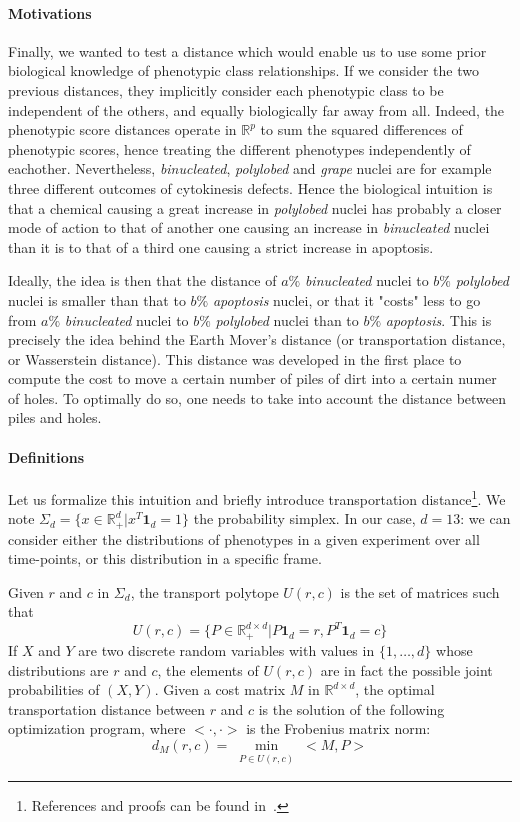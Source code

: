 \paragraph{Motivations}
Finally, we wanted to test a distance which would enable us to use some prior biological knowledge of phenotypic class relationships. If we consider the two previous distances, they implicitly consider each phenotypic class to be independent of the others, and equally biologically far away from all. Indeed, the phenotypic score distances operate in $\mathbb{R}^p$ to sum the squared differences of phenotypic scores, hence treating the different phenotypes independently of eachother. Nevertheless, \textit{binucleated}, \textit{polylobed} and \textit{grape} nuclei are for example three different outcomes of cytokinesis defects. Hence the biological intuition is that a chemical causing a great increase in \textit{polylobed} nuclei has probably a closer mode of action to that of another one causing an increase in \textit{binucleated} nuclei than it is to that of a third one causing a strict increase in apoptosis.

Ideally, the idea is then that the distance of $a\%$ \textit{binucleated} nuclei to $b\%$ \textit{polylobed} nuclei is smaller than that to $b\%$ \textit{apoptosis} nuclei, or that it "costs" less to go from $a\%$ \textit{binucleated} nuclei to $b\%$ \textit{polylobed} nuclei than to $b\%$ \textit{apoptosis}. This is precisely the idea behind the Earth Mover's distance (or transportation distance, or Wasserstein distance). This distance was developed in the first place to compute the cost to move a certain number of piles of dirt into a certain numer of holes. To optimally do so, one needs to take into account the distance between piles and holes.
\paragraph{Definitions}
Let us formalize this intuition and briefly introduce transportation distance\footnote{References and proofs can be found in~\cite{sinkhorn}.}. We note $\Sigma_d = \{ x \in \mathbb{R}^d_+ | x^T \mathbf{1}_d = 1\}$ the probability simplex. In our case, $d=13$: we can consider either the distributions of phenotypes in a given experiment over all time-points, or this distribution in a specific frame.

Given $r$ and $c$ in $\Sigma_d$, the transport polytope $U(r,c)$ is the set of matrices such that 
\[
U(r,c)=\{ P\in \mathbb{R}^{d\times d}_+ | P\mathbf{1}_d = r, P^T \mathbf{1}_d = c \}\] 
If $X$ and $Y$ are two discrete random variables with values in $ \{1,\ldots , d\} $ whose distributions are $r$ and $c$, the elements of $U(r,c)$ are in fact the possible joint probabilities of $\left( X,Y\right)$. Given a cost matrix $M$ in $\mathbb{R}^{d\times d}$, the optimal transportation distance between $r$ and $c$ is the solution of the following optimization program, where $<\cdot, \cdot> $ is the Frobenius matrix norm:
\begin{equation}
d_M(r,c) = \min_{\substack{P\in U(r,c)}} <M,P>
\label{exact_emd}
\end{equation}


